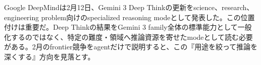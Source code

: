 Google DeepMindは2月12日、Gemini 3 Deep Thinkの更新をscience、research、engineering problem向けのspecialized reasoning modeとして発表した。この位置付けは重要だ。Deep Thinkの結果をGemini 3 family全体の標準能力として一般化するのではなく、特定の難度・領域へ推論資源を寄せたmodeとして読む必要がある。2月のfrontier競争をagentだけで説明すると、この『用途を絞って推論を深くする』方向を見落とす。\autocite{src-dd5d9b8662f3}


